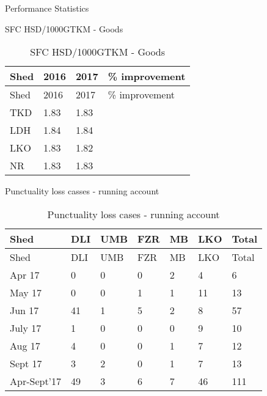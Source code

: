 \documentclass[
  ignorenonframetext,
]{beamer}
\begin{document}
\begin{frame}{Performance Statistics}
\begin{block}{SFC HSD/1000GTKM - Goods}
\protect\hypertarget{sfc-hsd1000gtkm---goods}{}
\begin{longtable}[]{@{}llll@{}}
\caption{SFC HSD/1000GTKM - Goods}\tabularnewline
\toprule
Shed & 2016 & 2017 & \% improvement \\
\midrule
\endfirsthead
\toprule
Shed & 2016 & 2017 & \% improvement \\
\midrule
\endhead
TKD & 1.83 & 1.83 & \\
LDH & 1.84 & 1.84 & \\
LKO & 1.83 & 1.82 & \\
NR & 1.83 & 1.83 & \\
\bottomrule
\end{longtable}

\begin{block}{Punctuality loss casses - running account}
\protect\hypertarget{punctuality-loss-casses---running-account}{}
\begin{longtable}[]{@{}lllllll@{}}
\caption{Punctuality loss cases - running account}\tabularnewline
\toprule
Shed & DLI & UMB & FZR & MB & LKO & Total \\
\midrule
\endfirsthead
\toprule
Shed & DLI & UMB & FZR & MB & LKO & Total \\
\midrule
\endhead
Apr 17 & 0 & 0 & 0 & 2 & 4 & 6 \\
May 17 & 0 & 0 & 1 & 1 & 11 & 13 \\
Jun 17 & 41 & 1 & 5 & 2 & 8 & 57 \\
July 17 & 1 & 0 & 0 & 0 & 9 & 10 \\
Aug 17 & 4 & 0 & 0 & 1 & 7 & 12 \\
Sept 17 & 3 & 2 & 0 & 1 & 7 & 13 \\
Apr-Sept'17 & 49 & 3 & 6 & 7 & 46 & 111 \\
\bottomrule
\end{longtable}
\end{block}
\end{block}
\end{frame}
\end{document}
